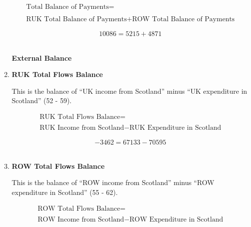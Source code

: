 \begin{enumerate}
\begin{equation}
\begin{split}
\text{Total Balance of Payments} =  \\ \\
\text{RUK Total Balance of Payments}+\text{ROW Total Balance of Payments}
\end{split} \label{eq:2.5.75}
\end{equation}

\begin{equation} \nonumber
10086 = 5215+4871
\end{equation}\\



\pagebreak

\begin{center}
\textbf{\LARGE External Balance}
\end{center}

\item \textbf {RUK Total Flows Balance}

This is the balance of “UK income from Scotland” minus “UK expenditure in Scotland” (52 - 59).

\begin{equation}
\begin{split}
\text{RUK Total Flows Balance} =  \\ \\
\text{RUK Income from Scotland}- \text{RUK Expenditure in Scotland}
\end{split} \label{eq:2.5.76}
\end{equation}

\begin{equation} \nonumber
-3462 = 67133-70595
\end{equation}\\


\item \textbf {ROW Total Flows Balance}

This is the balance of “ROW income from Scotland” minus “ROW expenditure in Scotland” (55 - 62).

\begin{equation}
\begin{split}
\text{ROW Total Flows Balance} =  \\ \\
\text{ROW Income from Scotland}- \text{ROW Expenditure in Scotland}
\end{split} \label{eq:2.5.77}
\end{equation}


\end{enumerate}
